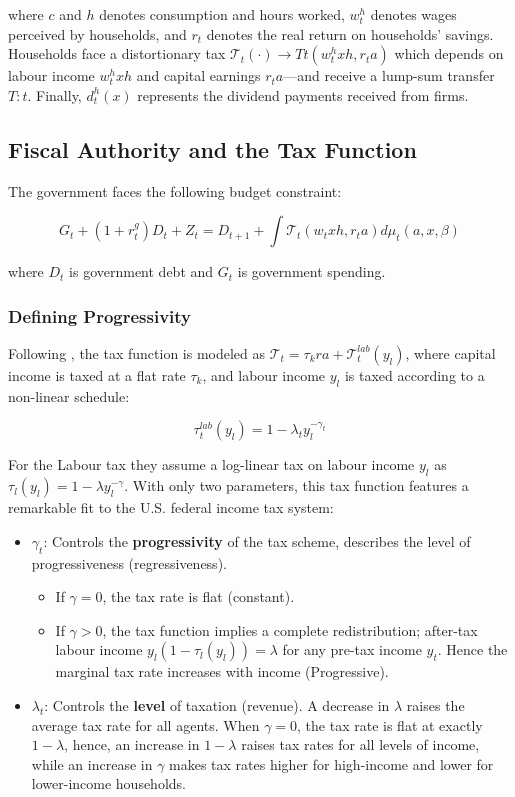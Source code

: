 \documentclass[12pt,letterpaper]{article}
\begin{document}
where $c$ and $h$ denotes consumption and hours worked, $w^h_t$ denotes wages perceived by households, and $r_t$ denotes the real return on households’ savings. 
Households face a distortionary tax $\mathcal{T}_t(\cdot) \xrightarrow{} Tt(w^h_txh,r_ta)$ which
depends on labour income $w^h_txh$ and capital earnings $r_ta$—and receive a lump-sum transfer $T:t$. Finally, $d^h_t(x)$ represents the dividend payments received from firms.

\subsection{Fiscal Authority and the Tax Function}
The government faces the following budget constraint:

\begin{equation}
    G_t + (1+r^g_t) D_t + Z_t = D_{t+1} + \int \mathcal{T}_t (w_t x h, r_t a) d\mu_t(a,x,\beta)
    \label{eq:gov_budget}
\end{equation}

where $D_t$ is government debt and $G_t$ is government spending.

\subsubsection{Defining Progressivity}
Following \cite{heathcote2017}, the tax function is modeled as $\mathcal{T}_t = \tau_k r a + \mathcal{T}^{lab}_t(y_l)$, where capital income is taxed at a flat rate $\tau_k$, and labour income $y_l$ is taxed according to a non-linear schedule:

\begin{equation}
    \tau^{lab}_t(y_l) = 1 - \lambda_t y_l^{-\gamma_t}
    \label{eq:hsv_tax}
\end{equation}

For the Labour tax they assume a log-linear tax on labour income $y_l$ as $\tau_l(y_l) = 1 - \lambda y^{-\gamma}_l$. With only two parameters, this tax function features a remarkable fit to the U.S. federal income tax system:
\begin{itemize}
    \item $\gamma_t$: Controls the \textbf{progressivity} of the tax scheme, describes the level of progressiveness (regressiveness).
    \begin{itemize}
        \item If $\gamma = 0$, the tax rate is flat (constant).
        \item If $\gamma > 0$, the tax function implies a complete redistribution; after-tax labour income $y_l(1 - \tau_l(y_l)) = \lambda$ for any pre-tax income $y_t$. Hence the marginal tax rate increases with income (Progressive).
    \end{itemize}
    \item $\lambda_t$: Controls the \textbf{level} of taxation (revenue). A decrease in $\lambda$ raises the average tax rate for all agents. When $\gamma = 0 $, the tax rate is flat at exactly $1 - \lambda$, hence, an increase in $1 - \lambda$ raises tax rates for all levels of income, while an increase in $\gamma$ makes tax rates higher for high-income and lower for lower-income households.
\end{itemize}
\end{document}
